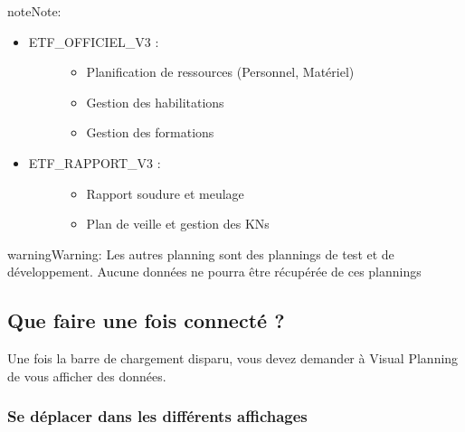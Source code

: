 \documentclass[letterpaper,10pt,english]{sphinxmanual}
\begin{document}
\begin{sphinxadmonition}{note}{Note:}\begin{itemize}
\item {} \begin{description}
\item[{ETF\_OFFICIEL\_V3 :}] \leavevmode\begin{itemize}
\item {} 
Planification de ressources (Personnel, Matériel)

\item {} 
Gestion des habilitations

\item {} 
Gestion des formations

\end{itemize}

\end{description}

\item {} \begin{description}
\item[{ETF\_RAPPORT\_V3 :}] \leavevmode\begin{itemize}
\item {} 
Rapport soudure et meulage

\item {} 
Plan de veille et gestion des KNs

\end{itemize}

\end{description}

\end{itemize}
\end{sphinxadmonition}

\begin{sphinxadmonition}{warning}{Warning:}
Les autres planning sont des plannings de test et de développement. Aucune données ne pourra être récupérée de ces plannings
\end{sphinxadmonition}


\subsection{Que faire une fois connecté ?}
\label{\detokenize{guide_visual_planning/guide_utilisation:que-faire-une-fois-connecte}}
Une fois la barre de chargement disparu, vous devez demander à Visual Planning de vous afficher des données.


\subsubsection{Se déplacer dans les différents affichages}
\label{\detokenize{guide_visual_planning/guide_utilisation:se-deplacer-dans-les-differents-affichages}}
\end{document}
